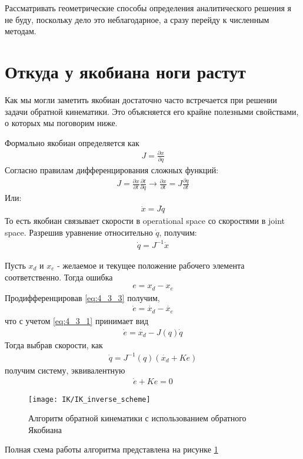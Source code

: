 Рассматривать геометрические способы определения аналитического решения я не буду, поскольку дело это неблагодарное, а сразу перейду к численным методам.

\section{Откуда у якобиана ноги растут} \label{sect:4_3}
Как мы могли заметить якобиан достаточно часто встречается при решении задачи обратной кинематики. Это объясняется его крайне полезными свойствами, о которых мы поговорим ниже.

Формально якобиан определяется как
\begin{align*}
	J = \frac{\partial x}{\partial q}
\end{align*} 
Согласно правилам дифференцирования сложных функций:
\begin{align*}
	J = \frac{\partial x}{\partial t} \frac{\partial t}{\partial q}		\rightarrow		\frac{\partial x}{\partial t} = J\frac{\partial q}{\partial t}
\end{align*}
Или:
\begin{align} \label{eq:4_3_1}
	\dot{x} = J\dot{q}
\end{align}
То есть якобиан связывает скорости в operational space со скоростями в joint space. Разрешив уравнение относительно $\dot{q}$, получим:
\begin{align*}
	\dot{q} = J^{-1}\dot{x}
\end{align*}

Пусть $x_{d}$ и $x_{e}$ - желаемое и текущее положение рабочего элемента соответственно. Тогда ошибка 
\begin{align} \label{eq:4_3_3}
e = x_{d} - x_{e}
\end{align}
Продифференцировав \ref{eq:4_3_3} получим,
\begin{align*}
	\dot{e} = \dot{x_{d}} - \dot{x_{e}}
\end{align*}
что с учетом \ref{eq:4_3_1} принимает вид
\begin{align*}
	\dot{e} = \dot{x_{d}} - J(q)\dot{q}
\end{align*}
Тогда выбрав скорости, как
\begin{align} \label{eq:4_3_4}
	\dot{q} = J^{-1}(q)(\dot{x_{d}} + Ke)
\end{align}
получим систему, эквивалентную
\begin{align} \label{eq:4_3_5}
	\dot{e} + Ke = 0
\end{align}
\begin{figure}[ht]
	\centering
	\texttt{[image: IK/IK\_inverse\_scheme]}
	\caption{Алгоритм обратной кинематики с использованием обратного Якобиана}
	\label{fig:ik_inverse_sheme}
\end{figure}
Полная схема работы алгоритма представлена на рисунке \ref{fig:ik_inverse_sheme}

